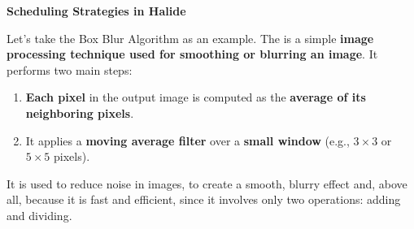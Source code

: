 \highspace
\begin{flushleft}
    \textcolor{Green3}{ \textbf{Scheduling Strategies in Halide}}
\end{flushleft}
Let's take the Box Blur Algorithm as an example. The  is a simple \textbf{image processing technique used for smoothing or blurring an image}. It performs two main steps:
\begin{enumerate}
    \item \textbf{Each pixel} in the output image is computed as the \textbf{average of its neighboring pixels}.
    \item It applies a \textbf{moving average filter} over a \textbf{small window} (e.g., $3 \times 3$ or $5 \times 5$ pixels).
\end{enumerate}
It is used to reduce noise in images, to create a smooth, blurry effect and, above all, because it is fast and efficient, since it involves only two operations: adding and dividing.

